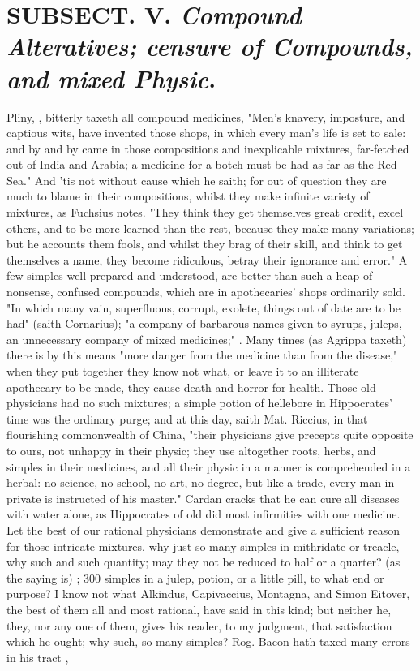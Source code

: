 {\section{ SUBSECT. V. \emph{Compound Alteratives; censure of Compounds, and mixed Physic}.}


Pliny, , bitterly taxeth all compound medicines, "Men's knavery, imposture, and captious wits, have invented those shops, in which every man's life is set to sale: and by and by came in those compositions and inexplicable mixtures, far-fetched out of India and Arabia; a medicine for a botch must be had as far as the Red Sea." And 'tis not without cause which he saith; for out of question they are much to blame in their compositions, whilst they make infinite variety of mixtures, as Fuchsius notes. "They think they get themselves great credit, excel others, and to be more learned than the rest, because they make many variations; but he accounts them fools, and whilst they brag of their skill, and think to get themselves a name, they become ridiculous, betray their ignorance and error." A few simples well prepared and understood, are better than such a heap of nonsense, confused compounds, which are in apothecaries' shops ordinarily sold. "In which many vain, superfluous, corrupt, exolete, things out of date are to be had" (saith Cornarius); "a company of barbarous names given to syrups, juleps, an unnecessary company of mixed medicines;" . Many times (as Agrippa taxeth) there is by this means "more danger from the medicine than from the disease," when they put together they know not what, or leave it to an illiterate apothecary to be made, they cause death and horror for health. Those old physicians had no such mixtures; a simple potion of hellebore in Hippocrates' time was the ordinary purge; and at this day, saith Mat. Riccius, in that flourishing commonwealth of China, "their physicians give precepts quite opposite to ours, not unhappy in their physic; they use altogether roots, herbs, and simples in their medicines, and all their physic in a manner is comprehended in a herbal: no science, no school, no art, no degree, but like a trade, every man in private is instructed of his master." Cardan cracks that he can cure all diseases with water alone, as Hippocrates of old did most infirmities with one medicine. Let the best of our rational physicians demonstrate and give a sufficient reason for those intricate mixtures, why just so many simples in mithridate or treacle, why such and such quantity; may they not be reduced to half or a quarter?  (as the saying is) ; 300 simples in a julep, potion, or a little pill, to what end or purpose? I know not what Alkindus, Capivaccius, Montagna, and Simon Eitover, the best of them all and most rational, have said in this kind; but neither he, they, nor any one of them, gives his reader, to my judgment, that satisfaction which he ought; why such, so many simples? Rog. Bacon hath taxed many errors in his tract , }
